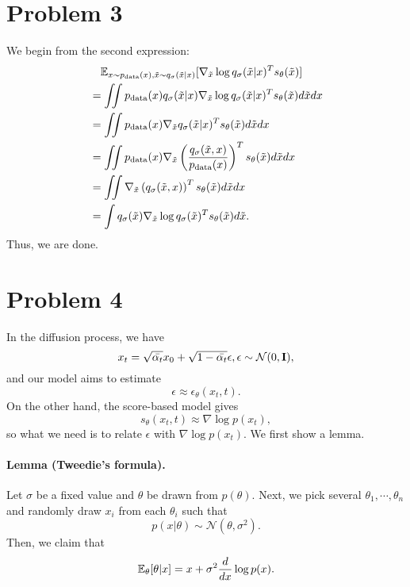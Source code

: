 \documentclass[a4 paper,12pt]{article}
\begin{document}
\section*{Problem 3}
We begin from the second expression:
\begin{align*}
&\quad \mathbb{E}_{x\sim p_{\text{data}}(x),\tilde{x}\sim q_\sigma(\tilde{x}|x)}[\nabla_{\tilde{x}}\log q_\sigma(\tilde{x}|x)^Ts_{\theta}(\tilde{x})]\\
&=\iint p_{\text{data}}(x)q_\sigma(\tilde{x}|x)\nabla_{\tilde{x}}\log q_\sigma(\tilde{x}|x)^Ts_{\theta}(\tilde{x})d\tilde{x}dx\\
&=\iint p_{\text{data}}(x)\nabla_{\tilde{x}} q_\sigma(\tilde{x}|x)^Ts_{\theta}(\tilde{x})d\tilde{x}dx\\
&=\iint p_{\text{data}}(x)\nabla_{\tilde{x}} \left(\frac{q_{\sigma}(\tilde{x},x)}{p_{\text{data}}(x)}\right)^Ts_{\theta}(\tilde{x})d\tilde{x}dx\\
&=\iint \nabla_{\tilde{x}} \left({q_{\sigma}(\tilde{x},x)}\right)^Ts_{\theta}(\tilde{x})d\tilde{x}dx\\
&=\int q_\sigma(\tilde{x})\nabla_{\tilde{x}}\log q_\sigma(\tilde{x})^Ts_{\theta}(\tilde{x})d\tilde{x}.
\end{align*} Thus, we are done.


\section*{Problem 4}
In the diffusion process, we have
\[
x_t=\sqrt{\bar{\alpha_t}}x_0+\sqrt{1-\bar{\alpha_t}}\epsilon,\epsilon\sim \mathcal{N}(0,\mathbf{I}),
\]
and our model aims to estimate
\[
\epsilon \approx \epsilon_\theta(x_t,t).
\]
On the other hand, the score-based model gives
\[
s_\theta(x_t,t)\approx \nabla\log p(x_t),	
\]
so what we need is to relate $\epsilon$ with $\nabla \log p(x_t)$. We first show a lemma.

\paragraph*{Lemma (Tweedie's formula).} Let $\sigma$ be a fixed value and $\theta$ be drawn from $p(\theta)$. Next, we pick several $\theta_1,\cdots,\theta_n$ and randomly draw $x_i$ from each $\theta_i$ such that
\[
p(x|\theta)\sim \mathcal{N}(\theta, \sigma^2).
\]
Then, we claim that
\[
\mathbb{E}_\theta[\theta|x]=x+\sigma^2\frac{d}{dx}\log p(x).
\]
\end{document}
